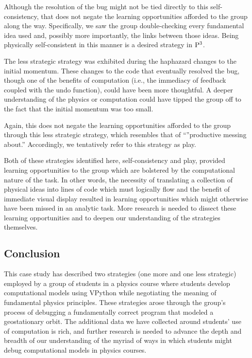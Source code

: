 \documentclass{msuphddissertation}
\begin{document}
\begin{doublespace}
Although the resolution of the bug might not be tied directly to this self-consistency, that does not negate the learning opportunities afforded to the group along the way. Specifically, we saw the group double-checking every fundamental idea used and, possibly more importantly, the links between those ideas. Being physically self-consistent in this manner is a desired strategy in ${\rm P}^{3}$.

The less strategic strategy was exhibited during the haphazard changes to the initial momentum. These changes to the code that eventually resolved the bug, though one of the benefits of computation (i.e., the immediacy of feedback coupled with the undo function), could have been more thoughtful. A deeper understanding of the physics or computation could have tipped the group off to the fact that the initial momentum was too small.

Again, this does not negate the learning opportunities afforded to the group through this less strategic strategy, which resembles  that of ``''productive messing about.'' \cite{AAPT2016}  Accordingly, we tentatively refer to this strategy as play.

Both of these strategies identified here, self-consistency and play, provided learning opportunities to the group which are bolstered by the computational nature of the task. In other words, the necessity of translating a collection of physical ideas into lines of code which must logically  flow and the benefit of immediate visual display resulted in learning opportunities which might otherwise have been missed in an analytic task. More research is needed to dissect these learning opportunities and to deepen our understanding of the strategies themselves.

\subsection{Conclusion}

This case study has described two strategies (one more and one less strategic) employed by a group of students in a physics course where students develop computational models using VPython while negotiating the meaning of fundamental physics principles. These strategies arose through the group's process of debugging a fundamentally correct program that modeled a geostationary orbit. The additional data we have collected around students' use of computation is rich, and further research is needed to advance the depth and breadth of our understanding of the myriad of ways in which students might debug computational models in physics courses.


\end{doublespace}
\end{document}
